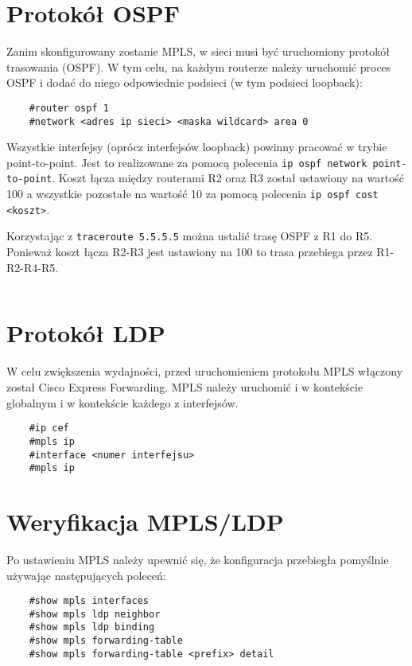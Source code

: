 \documentclass[a4paper,12pt,notitlepage]{article}
\begin{document}
\section{Protokół OSPF}

Zanim skonfigurowany zostanie MPLS, w sieci musi być uruchomiony protokół trasowania (OSPF). W tym celu, na każdym routerze należy uruchomić proces OSPF i dodać do niego odpowiednie podsieci (w tym podsieci loopback):
\begin{verbatim}
    #router ospf 1
    #network <adres ip sieci> <maska wildcard> area 0
\end{verbatim}

Wszystkie interfejsy (oprócz interfejsów loopback) powinny pracować w trybie point-to-point. Jest to realizowane za pomocą polecenia \texttt{ip ospf network point-to-point}. Koszt łącza między routerami R2 oraz R3 został ustawiony na wartość 100 a wszystkie pozostałe na wartość 10 za pomocą polecenia \texttt{ip ospf cost <koszt>}.

Korzystając z  \texttt{traceroute 5.5.5.5} można ustalić trasę OSPF z R1 do R5. Ponieważ koszt łącza R2-R3 jest ustawiony na 100 to trasa przebiega przez R1-R2-R4-R5.
\inputminted[label=Traceroute R1 do R5, firstline=175, lastline=182]{text}{R/R1.txt}

\section{Protokół LDP}

W celu zwiększenia wydajności, przed uruchomieniem protokołu MPLS włączony został Cisco Express Forwarding. MPLS należy uruchomić i w kontekście globalnym i w kontekście każdego z interfejsów.
\begin{verbatim}
    #ip cef
    #mpls ip
    #interface <numer interfejsu>
    #mpls ip
\end{verbatim}

\section{Weryfikacja MPLS/LDP}

Po ustawieniu MPLS należy upewnić się, że konfiguracja przebiegła pomyślnie używając następujących poleceń:
\begin{verbatim}
    #show mpls interfaces
    #show mpls ldp neighbor
    #show mpls ldp binding
    #show mpls forwarding-table
    #show mpls forwarding-table <prefix> detail
\end{verbatim}
\end{document}
